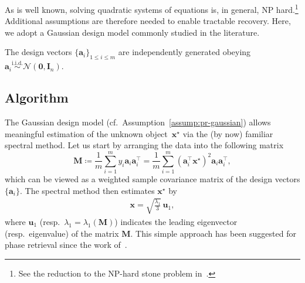 %
%


As is well known, solving quadratic systems of equations is, in general, NP hard.\footnote{See the reduction to the NP-hard stone problem in~\citet{chen2015solving}.}
Additional assumptions are therefore needed to enable tractable recovery.
Here, we adopt a Gaussian design model commonly studied in the literature.
%
\begin{assumption}
\label{assump:pr-gaussian}
	The design vectors $\{\bm{a}_i\}_{1\leq i\leq m}$ are independently generated  obeying $\bm{a}_{i}\overset{\text{i.i.d.}}{\sim}\mathcal{N}(\bm{0},\bm{I}_{n})$.
\end{assumption}





\subsection{Algorithm}\label{sec:pr-alg}


The Gaussian design model (cf.~Assumption~\ref{assump:pr-gaussian}) allows meaningful estimation of the unknown object~$\bm{x}^{\star}$ via the (by now) familiar spectral method.
Let us start by arranging the data into the following matrix
%
\begin{equation}
\bm{M}\coloneqq\frac{1}{m}\sum_{i=1}^{m}y_{i}\bm{a}_{i}\bm{a}_{i}^{\top}=\frac{1}{m}\sum_{i=1}^{m}(\bm{a}_{i}^{\top}\bm{x}^{\star})^{2}\bm{a}_{i}\bm{a}_{i}^{\top},\label{eq:D_PR_org}
\end{equation}
%
which can be viewed as a weighted sample covariance matrix of the design
vectors $\{\bm{a}_{i}\}$. The spectral method then estimates $\bm{x}^{\star}$ by
%
\begin{align}
	\bm{x}=\sqrt{\frac{\lambda_{1}}{3}}\,\bm{u}_{1},\label{eq:init-PR}
\end{align}
%
where $\bm{u}_{1}$ (resp.~$\lambda_{1}=\lambda_{1}(\bm{M})$) indicates
the leading eigenvector (resp.~eigenvalue) of the matrix
$\bm{M}$. This simple approach has been suggested for phase retrieval since the work of~\citet{netrapalli2015phase}.


